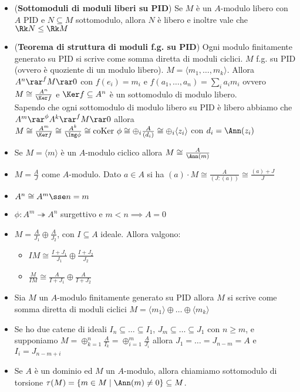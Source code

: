 \documentclass[a4paper,NoNotes,GeneralMath]{stdmdoc}
\newcommand{\srar}{\twoheadrightarrow}
\newcommand{\coKer}{\text{coKer }}
\newcommand{\gen}[1]{\langle {#1} \rangle}
\begin{document}
\begin{itemize}
		\item ({\bf Sottomoduli di moduli liberi su PID}) Se $M$ è un $A$-modulo libero con $A$ PID e $N \subseteq M$ sottomodulo, allora $N$ è libero e inoltre vale che $\Rk N \le \Rk M$
		\item ({\bf Teorema di struttura di moduli f.g. su PID}) Ogni modulo finitamente generato su PID si scrive come somma diretta di moduli ciclici. $M$ f.g. su PID (ovvero è quoziente di un modulo libero). $M = \gen{m_1, \ldots, m_k}$. Allora $A^n \rar^f M \rar 0$ con $f(e_i) = m_i$ e $f(a_1, \ldots, a_n) = \sum_i a_i m_i$ ovvero $M \cong \frac{A^n}{\Ker f}$ e $\Ker f \subseteq A^n$ è un sottomodulo di modulo libero. \\
		Sapendo che ogni sottomodulo di modulo libero su PID è libero abbiamo che $A^m \rar^\phi A^k \rar^f M \rar 0$ allora $M \cong \frac{A^m}{\Ker f} \cong \frac{A^k}{\Img \phi} \cong \coKer \phi \cong \oplus_i \frac{A}{(d_i)} \cong \oplus_i \gen{z_i}$ con $d_i = \Ann(z_i)$
		\item Se $M = \gen{m}$ è un $A$-modulo ciclico allora $M \cong \frac{A}{\Ann(m)}$
		\item $M = \frac{A}{J}$ come $A$-modulo. Dato $a \in A$ si ha $(a) \cdot M \cong \frac{A}{(J : (a))} \cong \frac{(a) + J}{J}$
		\item $A^n \cong A^m \sse n = m$
		\item $\phi: A^m \srar A^n$ surgettivo e $m < n \implies A = 0$
		\item $M = \frac{A}{J_1} \oplus \frac{A}{J_2}$, con $I \subseteq A$ ideale. Allora valgono:
			\begin{itemize}
				\item $IM \cong \frac{I + J_1}{J_1} \oplus \frac{I + J_2}{J_2}$
				\item $\frac{M}{IM} \cong \frac{A}{I + J_1} \oplus \frac{A}{I + J_2}$
			\end{itemize}
		\item Sia $M$ un $A$-modulo finitamente generato su PID allora $M$ si scrive come somma diretta di moduli ciclici $M = \gen{m_1} \oplus \ldots \oplus \gen{m_k}$
		\item Se ho due catene di ideali $I_n \subseteq \ldots \subseteq I_1$, $J_m \subseteq \ldots \subseteq J_1$ con $n \ge m$, e supponiamo $M = \oplus_{k=1}^n \frac{A}{I_k} = \oplus_{i=1}^m \frac{A}{J_i}$ allora $J_1 = \ldots = J_{n-m} = A$ e $I_i = J_{n-m+i}$
		\item Se $A$ è un dominio ed $M$ un $A$-modulo, allora chiamiamo sottomodulo di torsione $\tau(M) = \{ m \in M \mid \Ann(m) \neq 0 \} \subseteq M$.

\end{itemize}
\end{document}

